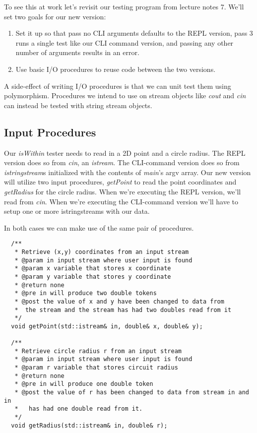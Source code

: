 \documentclass[nobib]{tufte-handout}
\begin{document}
To see this at work let's revisit our testing program from lecture notes 7. We'll set two goals for our new version:
\begin{enumerate}
\item Set it up so that pass no CLI arguments defaults to the REPL version, pass 3 runs a single test like our CLI command version, and passing any other number of arguments results in an error.

\item Use basic I/O procedures to reuse code between the two versions.
\end{enumerate}
A side-effect of writing I/O procedures is that we can unit test them using polymorphism.  Procedures we intend to use on stream objects like \textit{cout} and \textit{cin} can instead be tested with string stream objects.

\subsection{Input Procedures}

Our \textit{isWithin} tester needs to read in a 2D point and a circle radius.  The REPL version does so from \textit{cin}, an \textit{istream}.  The CLI-command version does so from \textit{istringstream}s initialized with the contents of \textit{main}'s argv array. Our new version will utilize two input procedures, \textit{getPoint} to read the point coordinates and \textit{getRadius} for the circle radius. When we're executing the REPL version, we'll read from \textit{cin}. When we're executing the CLI-command version we'll have to setup one or more istringstreams with our data. 

In both cases we can make use of the same pair of procedures.
\begin{verbatim}
  /**
   * Retrieve (x,y) coordinates from an input stream
   * @param in input stream where user input is found
   * @param x variable that stores x coordinate
   * @param y variable that stores y coordinate
   * @return none
   * @pre in will produce two double tokens
   * @post the value of x and y have been changed to data from
   *  the stream and the stream has had two doubles read from it
   */
  void getPoint(std::istream& in, double& x, double& y);

  /**
   * Retrieve circle radius r from an input stream
   * @param in input stream where user input is found
   * @param r variable that stores circuit radius
   * @return none
   * @pre in will produce one double token
   * @post the value of r has been changed to data from stream in and in
   *   has had one double read from it.
   */
  void getRadius(std::istream& in, double& r);
\end{verbatim}
\end{document}
